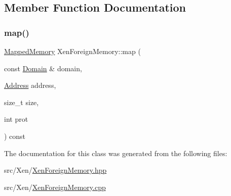 \subsection{Member Function Documentation}
\mbox{\label{classxd_1_1xen_1_1_xen_foreign_memory_a2a705269dc085f9052d500dac7fb49b0}} 
\subsubsection{\texorpdfstring{map()}{map()}}
{\footnotesize\ttfamily \mbox{\hyperlink{namespacexd_1_1xen_ac9cd783e07e8d847ac0805eec3536746}{Mapped\+Memory}} Xen\+Foreign\+Memory\+::map (\begin{DoxyParamCaption}\item[{const \mbox{\hyperlink{classxd_1_1xen_1_1_domain}{Domain}} \&}]{domain,  }\item[{\mbox{\hyperlink{namespacexd_1_1xen_a94a8d6c9448e8330c771c100dba152c3}{Address}}}]{address,  }\item[{size\+\_\+t}]{size,  }\item[{int}]{prot }\end{DoxyParamCaption}) const}



The documentation for this class was generated from the following files\+:\begin{DoxyCompactItemize}
\item 
src/\+Xen/\mbox{\hyperlink{_xen_foreign_memory_8hpp}{Xen\+Foreign\+Memory.\+hpp}}\item 
src/\+Xen/\mbox{\hyperlink{_xen_foreign_memory_8cpp}{Xen\+Foreign\+Memory.\+cpp}}\end{DoxyCompactItemize}
